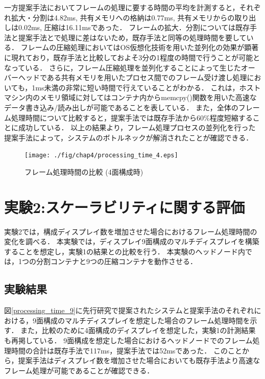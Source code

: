 一方提案手法においてフレームの処理に要する時間の平均を計測すると，それぞれ拡大・分割は4.82ms, 共有メモリへの格納は0.77ms, 共有メモリからの取り出しは0.02ms, 圧縮は16.11msであった．
フレームの拡大．分割については既存手法と提案手法とで処理に差はないため，既存手法と同等の処理時間を要している．
フレームの圧縮処理においてはOS仮想化技術を用いた並列化の効果が顕著に現れており，既存手法と比較しておよそ3分の1程度の時間で行うことが可能となっている．
さらに，フレーム圧縮処理を並列化することによって生じたオーバーヘッドである共有メモリを用いたプロセス間でのフレーム受け渡し処理においても，1ms未満の非常に短い時間で行えていることがわかる．
これは，ホストマシン内のメモリ領域に対してはコンテナ内からmemcpy()関数を用いた高速なデータ書き込み/読み出しが可能であることを表している．
また，全体のフレーム処理時間について比較すると，提案手法では既存手法から60\%程度短縮することに成功している．
以上の結果より，フレーム処理プロセスの並列化を行った提案手法によって，システムのボトルネックが解消されたことが確認できる．

\begin{figure}[H]
    \hspace*{\fill}
    \texttt{[image: ./fig/chap4/processing\_time\_4.eps]}
    \hspace*{\fill}
    \caption{フレーム処理時間の比較 (4面構成時)}
    \label{processing_time_4}
\end{figure}


\section{実験2:スケーラビリティに関する評価}
実験2では，構成ディスプレイ数を増加させた場合におけるフレーム処理時間の変化を調べる．
本実験では，ディスプレイ9面構成のマルチディスプレイを構築することを想定し，実験1の結果との比較を行う．
本実験のヘッドノード内では，1つの分割コンテナと9つの圧縮コンテナを動作させる．

 \subsection*{実験結果}
 図\ref{processing_time_9}に先行研究で提案されたシステムと提案手法のそれぞれにおける，9面構成のマルチディスプレイを想定した場合のフレーム処理時間を示す．
 また，比較のために4面構成のディスプレイを想定した，実験1の計測結果も再掲している．
 9面構成を想定した場合におけるヘッドノードでのフレーム処理時間の合計は既存手法で117ms，提案手法では52msであった．
 このことから，提案手法はディスプレイ数を増加させた場合においても既存手法より高速なフレーム処理が可能であることが確認できる．

